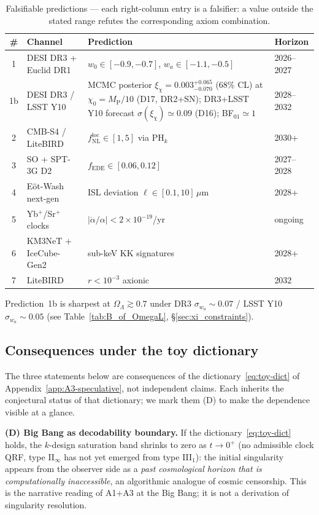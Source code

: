 \documentclass[epjc3,twocolumn]{svjour3}
\begin{document}
\begin{table}[h]
\centering
\caption{Falsifiable predictions --- each right-column entry is a falsifier: a value outside the stated range refutes the corresponding axiom combination.}
\begin{tabular}{@{}cl p{7.5cm} l@{}}
\hline
\# & Channel & Prediction & Horizon \\
\hline
1 & DESI DR3 + Euclid DR1 & $w_0 \in [-0.9, -0.7]$, $w_a \in [-1.1, -0.5]$ & 2026--2027 \\
1b & DESI DR3 / LSST Y10 & MCMC posterior $\xi_\chi=0.003^{+0.065}_{-0.070}$ (68\% CL) at $\chi_0=M_\mathrm{P}/10$ (D17, DR2+SN); DR3+LSST Y10 forecast $\sigma(\xi_\chi)\!\simeq\!0.09$ (D16); BF$_{01}\!\simeq\!1$ & 2028--2032 \\
2 & CMB-S4 / LiteBIRD & $f_{\mathrm{NL}}^{\mathrm{loc}} \in [1, 5]$ via $\mathrm{PH}_k$ & 2030+ \\
3 & SO + SPT-3G D2 & $f_{\mathrm{EDE}} \in [0.06, 0.12]$ & 2027--2028 \\
4 & Eöt-Wash next-gen & ISL deviation $\ell \in [0.1, 10]\,\mu$m & 2028+ \\
5 & Yb$^+$/Sr$^+$ clocks & $|\dot \alpha / \alpha| < 2 \times 10^{-19}$/yr & ongoing \\
6 & KM3NeT + IceCube-Gen2 & sub-keV KK signatures & 2028+ \\
7 & LiteBIRD & $r < 10^{-3}$ axionic & 2032 \\
\hline
\end{tabular}
\end{table}

Prediction~1b is sharpest at $\Omega_\Lambda\!\gtrsim\!0.7$ under DR3 $\sigma_{w_a}\!\sim\!0.07$ / LSST Y10 $\sigma_{w_a}\!\sim\!0.05$ (see Table~\ref{tab:B_of_OmegaL}, \S\ref{sec:xi_constraints}).

\subsection{Consequences under the toy dictionary}

The three statements below are consequences of the dictionary~\eqref{eq:toy-dict} of Appendix~\ref{app:A3-speculative}, not independent claims. Each inherits the conjectural status of that dictionary; we mark them (D) to make the dependence visible at a glance.

\smallskip\noindent\textbf{(D) Big Bang as decodability boundary.}
If the dictionary~\eqref{eq:toy-dict} holds, the $k$-design saturation band shrinks to zero as $t \to 0^+$ (no admissible clock QRF, type II$_\infty$ has not yet emerged from type III$_1$): the initial singularity appears from the observer side as a \emph{past cosmological horizon that is computationally inaccessible}, an algorithmic analogue of cosmic censorship. This is the narrative reading of A1+A3 at the Big Bang; it is not a derivation of singularity resolution.
\end{document}
